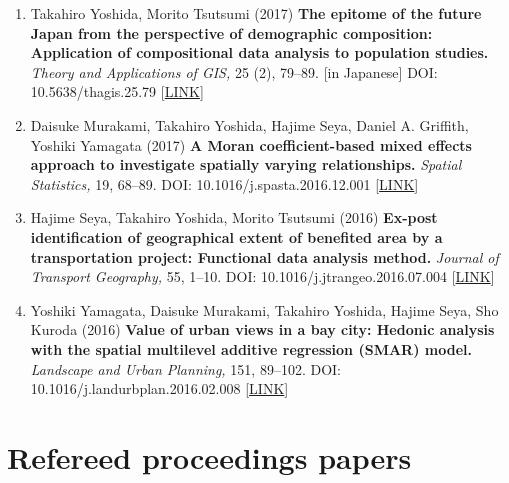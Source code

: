 \documentclass[
]{book}
\begin{document}
\begin{enumerate}
\item
  Takahiro Yoshida, Morito Tsutsumi (2017)
  \textbf{The epitome of the future Japan from the perspective of demographic composition: Application of compositional data analysis to population studies.}
  \emph{Theory and Applications of GIS,} 25 (2), 79--89. {[}in Japanese{]}
  DOI: 10.5638/thagis.25.79 {[}\href{https://www.jstage.jst.go.jp/article/thagis/25/2/25_79/_article/-char/en}{LINK}{]}
\item
  Daisuke Murakami, Takahiro Yoshida, Hajime Seya, Daniel A. Griffith, Yoshiki Yamagata (2017)
  \textbf{A Moran coefficient-based mixed effects approach to investigate spatially varying relationships.}
  \emph{Spatial Statistics,} 19, 68--89.
  DOI: 10.1016/j.spasta.2016.12.001 {[}\href{http://www.sciencedirect.com/science/article/pii/S2211675316301798}{LINK}{]}
\item
  Hajime Seya, Takahiro Yoshida, Morito Tsutsumi (2016)
  \textbf{Ex-post identification of geographical extent of benefited area by a transportation project: Functional data analysis method.}
  \emph{Journal of Transport Geography,} 55, 1--10.
  DOI: 10.1016/j.jtrangeo.2016.07.004 {[}\href{http://www.sciencedirect.com/science/article/pii/S0966692316303763}{LINK}{]}
\item
  Yoshiki Yamagata, Daisuke Murakami, Takahiro Yoshida, Hajime Seya, Sho Kuroda (2016)
  \textbf{Value of urban views in a bay city: Hedonic analysis with the spatial multilevel additive regression (SMAR) model.}
  \emph{Landscape and Urban Planning,} 151, 89--102.
  DOI: 10.1016/j.landurbplan.2016.02.008 {[}\href{http://www.sciencedirect.com/science/article/pii/S0169204616000232}{LINK}{]}
\end{enumerate}

\hypertarget{refereed-proceedings-papers}{%
\section*{Refereed proceedings papers}\label{refereed-proceedings-papers}}
\end{document}

